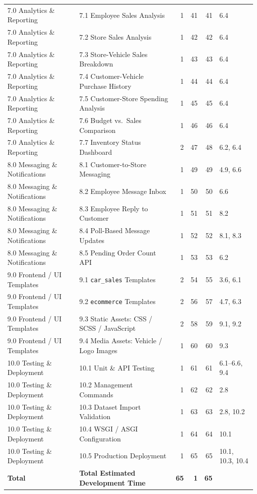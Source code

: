 \begin{longtable}{@{}p{3cm}p{5.5cm}rrrp{1.8cm}@{}}
7.0 Analytics \& Reporting
& 7.1 Employee Sales Analysis & 1 & 41 & 41 & 6.4 \\
7.0 Analytics \& Reporting
& 7.2 Store Sales Analysis & 1 & 42 & 42 & 6.4 \\
7.0 Analytics \& Reporting
& 7.3 Store-Vehicle Sales Breakdown & 1 & 43 & 43 & 6.4 \\
7.0 Analytics \& Reporting
& 7.4 Customer-Vehicle Purchase History & 1 & 44 & 44 & 6.4 \\
7.0 Analytics \& Reporting
& 7.5 Customer-Store Spending Analysis & 1 & 45 & 45 & 6.4 \\
7.0 Analytics \& Reporting
& 7.6 Budget vs.\ Sales Comparison & 1 & 46 & 46 & 6.4 \\
7.0 Analytics \& Reporting
& 7.7 Inventory Status Dashboard & 2 & 47 & 48 & 6.2, 6.4 \\

8.0 Messaging \& Notifications
& 8.1 Customer-to-Store Messaging & 1 & 49 & 49 & 4.9, 6.6 \\
8.0 Messaging \& Notifications
& 8.2 Employee Message Inbox & 1 & 50 & 50 & 6.6 \\
8.0 Messaging \& Notifications
& 8.3 Employee Reply to Customer & 1 & 51 & 51 & 8.2 \\
8.0 Messaging \& Notifications
& 8.4 Poll-Based Message Updates & 1 & 52 & 52 & 8.1, 8.3 \\
8.0 Messaging \& Notifications
& 8.5 Pending Order Count API & 1 & 53 & 53 & 6.2 \\

9.0 Frontend / UI Templates
& 9.1 \texttt{car\_sales} Templates & 2 & 54 & 55 & 3.6, 6.1 \\
9.0 Frontend / UI Templates
& 9.2 \texttt{ecommerce} Templates & 2 & 56 & 57 & 4.7, 6.3 \\
9.0 Frontend / UI Templates
& 9.3 Static Assets: CSS / SCSS / JavaScript & 2 & 58 & 59 & 9.1, 9.2 \\
9.0 Frontend / UI Templates
& 9.4 Media Assets: Vehicle / Logo Images & 1 & 60 & 60 & 9.3 \\

10.0 Testing \& Deployment
& 10.1 Unit \& API Testing & 1 & 61 & 61 & 6.1--6.6, 9.4 \\
10.0 Testing \& Deployment
& 10.2 Management Commands & 1 & 62 & 62 & 2.8 \\
10.0 Testing \& Deployment
& 10.3 Dataset Import Validation & 1 & 63 & 63 & 2.8, 10.2 \\
10.0 Testing \& Deployment
& 10.4 WSGI / ASGI Configuration & 1 & 64 & 64 & 10.1 \\
10.0 Testing \& Deployment
& 10.5 Production Deployment & 1 & 65 & 65 & 10.1, 10.3, 10.4 \\

\midrule
\textbf{Total}
& \textbf{Total Estimated Development Time}
& \textbf{65} & \textbf{1} & \textbf{65} & \\

\end{longtable}

